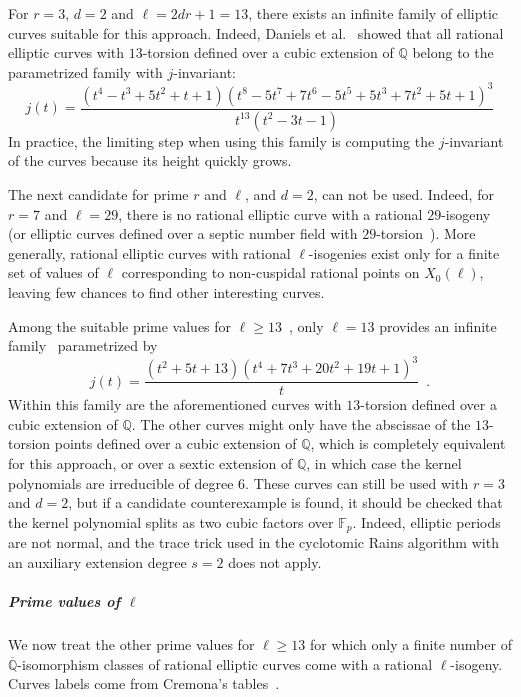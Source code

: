 \documentclass[12pt]{article}
\theoremstyle{plain}
\theoremstyle{definition}
\def\Q{\ensuremath{\mathbb{Q}}}
\def\F{\ensuremath{\mathbb{F}}}
\newcounter{algorithm}
\begin{document}
For $r = 3$, $d = 2$ and $\ell = 2 d r + 1 = 13$, there exists an
infinite family of elliptic curves suitable for this approach.
Indeed, Daniels et al.~\cite{daniels_torsion_2015} showed that
all rational elliptic curves with $13$-torsion defined over a cubic extension
of $\Q$ belong to the parametrized family with $j$-invariant:
\[
j(t)=\frac{\left(t^4-t^3+5 t^2 + t + 1\right) \left(t^8 - 5 t^7 + 7 t^6 - 5 t^5 + 5 t^3 + 7 t^2 + 5 t + 1\right)^3}{t^{13} \left(t^2 -3 t - 1\right)}
\]
In practice, the limiting step when using this family is computing
the $j$-invariant of the curves because its height quickly grows.

The next candidate for prime $r$ and $\ell$, and $d = 2$, can not be used.
Indeed, for $r = 7$ and $\ell = 29$, there is no rational elliptic curve
with a rational $29$-isogeny~\cite{Mazur1974} (or elliptic curves defined
over a septic number field with $29$-torsion~\cite{Derickx201452}).
More generally, rational elliptic curves with rational $\ell$-isogenies
exist only for a finite set of values of $\ell$ corresponding
to non-cuspidal rational points on $X_0(\ell)$, leaving few chances
to find other interesting curves.

Among the suitable prime values for $\ell \geq 13$~\cite{Mazur1974},
only $\ell = 13$ provides an infinite family~\cite{Lozano-Robledo2013}
parametrized by
\[
j(t) = \frac{\left(t^2 + 5t + 13\right)\left(t^4 + 7t^3 + 20t^2 + 19t + 1\right)^3}{t} \enspace .
\]
Within this family are the aforementioned curves with $13$-torsion
defined over a cubic extension of $\Q$.
The other curves might only have the abscissae of the $13$-torsion points
defined over a cubic extension of $\Q$,
which is completely equivalent for this approach,
or over a sextic extension of $\Q$,
in which case the kernel polynomials are irreducible of degree $6$.
These curves can still be used with $r = 3$ and $d = 2$,
but if a candidate counterexample is found, it should be checked
that the kernel polynomial splits as two cubic factors over $\F_p$.
Indeed, elliptic periods are not normal, and the trace trick used
in the cyclotomic Rains algorithm with an auxiliary extension degree
$s = 2$ does not apply.

\subparagraph{Prime values of $\ell$}
We now treat the other prime values for $\ell \geq 13$
for which only a finite number of $\overline{\Q}$-isomorphism
classes of rational elliptic curves come with a rational $\ell$-isogeny.
Curves labels come from Cremona's tables~\cite{cremona_tables}.
\end{document}
